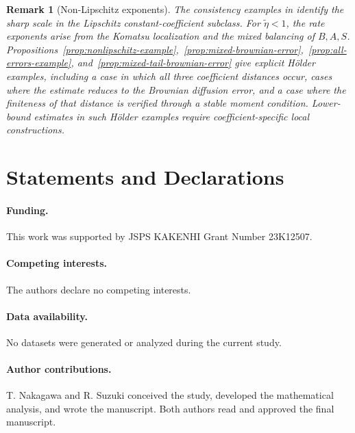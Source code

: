 \documentclass[11pt]{article}
\newtheorem{remark}[theorem]{Remark}
\newcommand{\1}{\mathbf{1}}
\newcommand{\wt}{\tilde}
\begin{document}
\begin{remark}[Non-Lipschitz exponents]
The consistency examples in  identify the sharp scale in the Lipschitz constant-coefficient subclass. For $\wt\eta<1$, the rate exponents arise from the Komatsu localization and the mixed balancing of $B,A,S$. Propositions~\ref{prop:nonlipschitz-example},~\ref{prop:mixed-brownian-error},~\ref{prop:all-errors-example}, and~\ref{prop:mixed-tail-brownian-error} give explicit H\"older examples, including a case in which all three coefficient distances occur, cases where the estimate reduces to the Brownian diffusion error, and a case where the finiteness of that distance is verified through a stable moment condition. Lower-bound estimates in such H\"older examples require coefficient-specific local constructions.
\end{remark}


\section*{Statements and Declarations}

\paragraph{Funding.}
This work was supported by JSPS KAKENHI Grant Number 23K12507.

\paragraph{Competing interests.}
The authors declare no competing interests.

\paragraph{Data availability.}
No datasets were generated or analyzed during the current study.

\paragraph{Author contributions.}
T. Nakagawa and R. Suzuki conceived the study, developed the mathematical analysis, and wrote the manuscript. Both authors read and approved the final manuscript.



\end{document}

